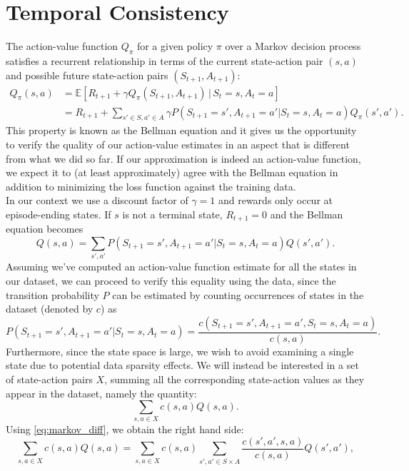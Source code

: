 \documentclass{sfuthesis}
\begin{document}
	\section{Temporal Consistency}
	
	The action-value function $Q_\pi$ for a given policy $\pi$ over a Markov decision process satisfies a recurrent relationship in terms of the current state-action pair $(s,a)$ and possible future state-action pairs $(S_{t+1},A_{t+1})$: 
	\begin{align}
		Q_\pi(s,a) &= \mathbb{E} \left[  R_{t+1} + \gamma Q_{\pi}(S_{t+1}, A_{t+1}) \, | \, S_t = s, A_t = a \right]\\
		&=  R_{t+1} + \sum_{s' \in S, a' \in A} \gamma P(S_{t+1} = s', A_{t+1} = a' | S_t = s, A_t = a) Q_\pi(s',a').
	\end{align}
	This property is known as the Bellman equation \cite{sutton2018reinforcement} and it gives us the opportunity to verify the quality of our action-value estimates in an aspect that is different from what we did so far. If our approximation is indeed an action-value function, we expect it to (at least approximately) agree with the Bellman equation in addition to minimizing the loss function against the training data.\\
	In our context we use a discount factor of $\gamma = 1$ and rewards only occur at episode-ending states. If $s$ is not a terminal state, $R_{t+1} = 0$ and the Bellman equation becomes
	\begin{equation}
		Q(s,a) = \sum_{s',a'} P(S_{t+1} = s', A_{t+1} = a' | S_t = s, A_t = a) Q(s',a').
		\label{eq:markov_diff}
	\end{equation}
	Assuming we've computed an action-value function estimate for all the states in our dataset, we can proceed to verify this equality using the data, since the transition probability $P$ can be estimated by counting occurrences of states in the dataset (denoted by $c$) as
	$$P(S_{t+1} = s', A_{t+1} = a' | S_t = s, A_t = a) = \frac{c(S_{t+1} = s', A_{t+1} = a', S_t = s, A_t = a)}{c(s,a)}.$$
	Furthermore, since the state space is large, we wish to avoid examining a single state due to potential data sparsity effects. We will instead be interested in a set of state-action pairs $X$, summing all the corresponding state-action values as they appear in the dataset, namely the quantity:
	$$\sum_{s,a\in X} c(s,a)Q(s,a).$$
	Using \eqref{eq:markov_diff}, we obtain the right hand side:
	\begin{equation}
		\sum_{s,a\in X} c(s,a)Q(s,a) = \sum_{s,a\in X} c(s,a)\sum_{s',a'\in S\times A} \frac{c(s',a',s,a)}{c(s,a)} Q(s',a'),
	\end{equation}
\end{document}
